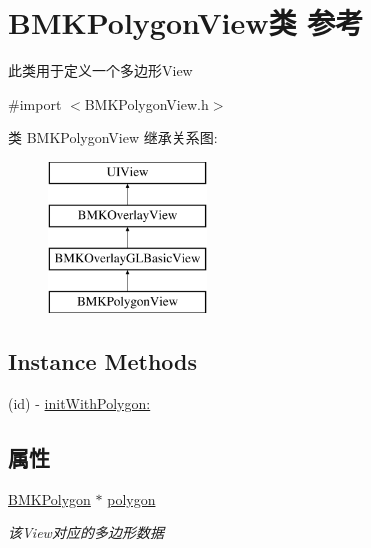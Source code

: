 \hypertarget{interface_b_m_k_polygon_view}{\section{B\+M\+K\+Polygon\+View类 参考}
\label{interface_b_m_k_polygon_view}
}


此类用于定义一个多边形\+View  




{\ttfamily \#import $<$B\+M\+K\+Polygon\+View.\+h$>$}

类 B\+M\+K\+Polygon\+View 继承关系图\+:\begin{figure}[H]
\begin{center}
\leavevmode
\includegraphics[height=4.000000cm]{interface_b_m_k_polygon_view}
\end{center}
\end{figure}
\subsection*{Instance Methods}
\begin{DoxyCompactItemize}
\item 
(id) -\/ \hyperlink{interface_b_m_k_polygon_view_a447c40c6fd5c04668d7b9da823a5af26}{init\+With\+Polygon\+:}
\end{DoxyCompactItemize}
\subsection*{属性}
\begin{DoxyCompactItemize}
\item 
\hypertarget{interface_b_m_k_polygon_view_afcb56ec12abe7a03236d732f63f555bd}{\hyperlink{interface_b_m_k_polygon}{B\+M\+K\+Polygon} $\ast$ \hyperlink{interface_b_m_k_polygon_view_afcb56ec12abe7a03236d732f63f555bd}{polygon}}\label{interface_b_m_k_polygon_view_afcb56ec12abe7a03236d732f63f555bd}

\begin{DoxyCompactList}\small\item\em 该\+View对应的多边形数据 \end{DoxyCompactList}\end{DoxyCompactItemize}
